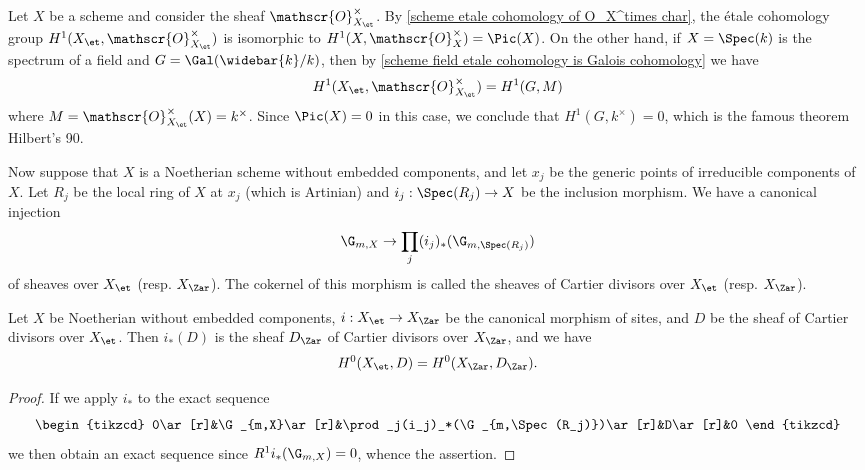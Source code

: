 \begin{example}\label{scheme etale cohomology Hilbert 90}
Let $X$ be a scheme and consider the sheaf $\mathscr{O}_{X_\et}^\times$. By \cref{scheme etale cohomology of O_X^times char}, the \'etale cohomology group $H^1(X_\et,\mathscr{O}_{X_\et}^\times)$ is isomorphic to $H^1(X,\mathscr{O}_X^\times)=\Pic(X)$. On the other hand, if $X=\Spec(k)$ is the spectrum of a field and $G=\Gal(\widebar{k}/k)$, then by \cref{scheme field etale cohomology is Galois cohomology} we have
\[H^1(X_\et,\mathscr{O}_{X_\et}^\times)=H^1(G,M)\]
where $M=\mathscr{O}_{X_\et}^\times(X)=k^\times$. Since $\Pic(X)=0$ in this case, we conclude that $H^1(G,k^\times)=0$, which is the famous theorem Hilbert's 90.
\end{example}

Now suppose that $X$ is a Noetherian scheme without embedded components, and let $x_j$ be the generic points of irreducible components of $X$. Let $R_j$ be the local ring of $X$ at $x_j$ (which is Artinian) and $i_j:\Spec(R_j)\to X$ be the inclusion morphism. We have a canonical injection
\[\G_{m,X}\to\prod_j(i_j)_*(\G_{m,\Spec(R_j)})\]
of sheaves over $X_\et$ (resp. $X_\Zar$). The cokernel of this morphism is called the sheaves of Cartier divisors over $X_\et$ (resp. $X_\Zar$).

\begin{corollary}\label{scheme Noe etale Cartier divisor sheaf direct image of Zar}
Let $X$ be Noetherian without embedded components, $i:X_\et\to X_\Zar$ be the canonical morphism of sites, and $D$ be the sheaf of Cartier divisors over $X_\et$. Then $i_*(D)$ is the sheaf $D_\Zar$ of Cartier divisors over $X_\Zar$, and we have
\[H^0(X_\et,D)=H^0(X_\Zar,D_\Zar).\]
\end{corollary}
\begin{proof}
If we apply $i_*$ to the exact sequence
\[\begin{tikzcd}
0\ar[r]&\G_{m,X}\ar[r]&\prod_j(i_j)_*(\G_{m,\Spec(R_j)})\ar[r]&D\ar[r]&0
\end{tikzcd}\]
we then obtain an exact sequence since $R^1i_*(\G_{m,X})=0$, whence the assertion.
\end{proof}

